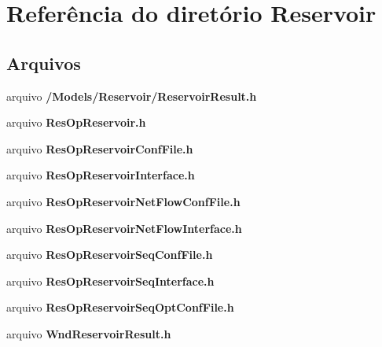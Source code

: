 \section{Referência do diretório Reservoir}
\label{dir_baed7f2e7829add86f4615b99507844b}
\subsection*{Arquivos}
\begin{DoxyCompactItemize}
\item 
arquivo {\bf /\+Models/\+Reservoir/\+Reservoir\+Result.\+h}
\item 
arquivo {\bf Res\+Op\+Reservoir.\+h}
\item 
arquivo {\bf Res\+Op\+Reservoir\+Conf\+File.\+h}
\item 
arquivo {\bf Res\+Op\+Reservoir\+Interface.\+h}
\item 
arquivo {\bf Res\+Op\+Reservoir\+Net\+Flow\+Conf\+File.\+h}
\item 
arquivo {\bf Res\+Op\+Reservoir\+Net\+Flow\+Interface.\+h}
\item 
arquivo {\bf Res\+Op\+Reservoir\+Seq\+Conf\+File.\+h}
\item 
arquivo {\bf Res\+Op\+Reservoir\+Seq\+Interface.\+h}
\item 
arquivo {\bf Res\+Op\+Reservoir\+Seq\+Opt\+Conf\+File.\+h}
\item 
arquivo {\bf Wnd\+Reservoir\+Result.\+h}
\end{DoxyCompactItemize}
